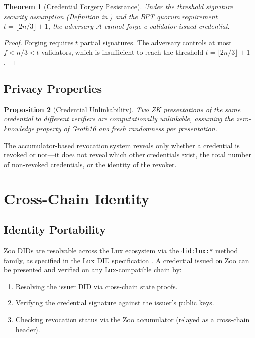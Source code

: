 \documentclass[11pt,letterpaper]{article}
\newtheorem{theorem}{Theorem}
\newtheorem{proposition}[theorem]{Proposition}
\theoremstyle{definition}
\theoremstyle{remark}
\begin{document}
\begin{theorem}[Credential Forgery Resistance]
Under the threshold signature security assumption (Definition in \cite{zoo-threshold-signatures}) and the BFT quorum requirement $t = \lfloor 2n/3 \rfloor + 1$, the adversary $\mathcal{A}$ cannot forge a validator-issued credential.
\end{theorem}

\begin{proof}
Forging requires $t$ partial signatures. The adversary controls at most $f < n/3 < t$ validators, which is insufficient to reach the threshold $t = \lfloor 2n/3 \rfloor + 1$.
\end{proof}

\subsection{Privacy Properties}

\begin{proposition}[Credential Unlinkability]
Two ZK presentations of the same credential to different verifiers are computationally unlinkable, assuming the zero-knowledge property of Groth16 and fresh randomness per presentation.
\end{proposition}

The accumulator-based revocation system reveals only whether a credential is revoked or not---it does not reveal which other credentials exist, the total number of non-revoked credentials, or the identity of the revoker.

\section{Cross-Chain Identity}

\subsection{Identity Portability}

Zoo DIDs are resolvable across the Lux ecosystem via the \texttt{did:lux:*} method family, as specified in the Lux DID specification \cite{lux-id-did-specification}. A credential issued on Zoo can be presented and verified on any Lux-compatible chain by:

\begin{enumerate}
\item Resolving the issuer DID via cross-chain state proofs.
\item Verifying the credential signature against the issuer's public keys.
\item Checking revocation status via the Zoo accumulator (relayed as a cross-chain header).
\end{enumerate}
\end{document}
